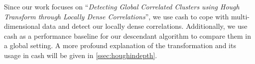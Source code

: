 Since our work focuses on ``\textit{Detecting Global Correlated Clusters using Hough Transform through Locally Dense Correlations}'', we use \gls{cash} to cope with multi-dimensional data and detect our locally dense correlations. Additionally, we use \gls{cash} as a performance baseline for our descendant algorithm to compare them in a global setting.
A more profound explanation of the transformation and its usage in \gls{cash} will be given in \autoref{ssec:houghindepth}.

\begin{table}[]
\centering
{}
\end{table}
